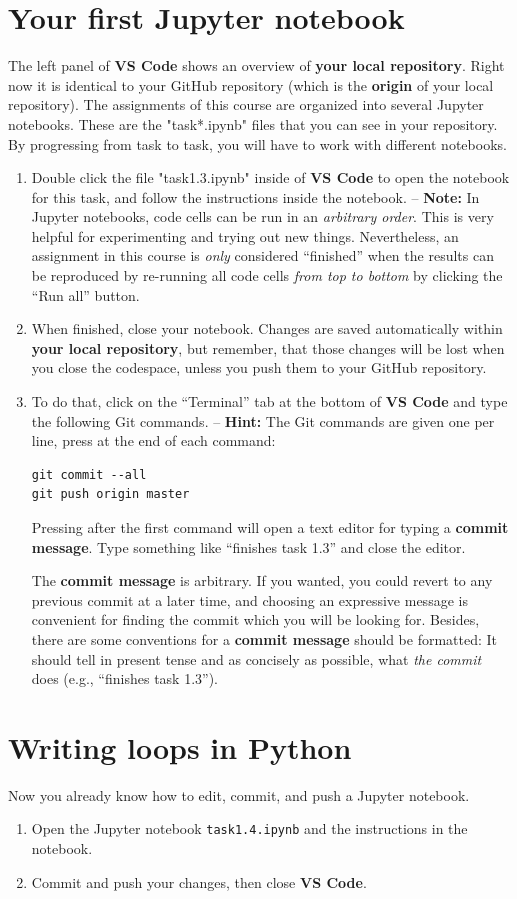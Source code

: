 \documentclass[12pt,a4paper]{article}
\begin{document}
\section{Your first Jupyter notebook}
The left panel of \textbf{VS Code} shows an overview of \textbf{your local repository}. Right now it is identical to your GitHub repository (which is the \textbf{origin} of your local repository). The assignments of this course are organized into several Jupyter notebooks. These are the "task*.ipynb" files that you can see in your repository. By progressing from task to task, you will have to work with different notebooks.

\begin{enumerate}
\item Double click the file "task1.3.ipynb" inside of \textbf{VS Code} to open the notebook for this task, and follow the instructions inside the notebook. -- \textbf{Note:} In Jupyter notebooks, code cells can be run in an \emph{arbitrary order}. This is very helpful for experimenting and trying out new things. Nevertheless, an assignment in this course is \emph{only} considered ``finished'' when the results can be reproduced by re-running all code cells \emph{from top to bottom} by clicking the ``Run all'' button.
\item When finished, close your notebook. Changes are saved automatically within \textbf{your local repository}, but remember, that those changes will be lost when you close the codespace, unless you push them to your GitHub repository.
\item To do that, click on the ``Terminal'' tab at the bottom of \textbf{VS Code} and type the following Git commands. -- \textbf{Hint:} The Git commands are given one per line, press \Return at the end of each command:
\begin{Verbatim}[frame=single]
git commit --all
git push origin master
\end{Verbatim}
Pressing \Return after the first command will open a text editor for typing a \textbf{commit message}. Type something like ``finishes task 1.3'' and close the editor.

The \textbf{commit message} is arbitrary. If you wanted, you could revert to any previous commit at a later time, and choosing an expressive message is convenient for finding the commit which you will be looking for. Besides, there are some conventions for a \textbf{commit message} should be formatted: It should tell in present tense and as concisely as possible, what \emph{the commit} does (e.g., ``finishes task 1.3'').
\end{enumerate}

\section{Writing loops in Python}
Now you already know how to edit, commit, and push a Jupyter notebook.
\begin{enumerate}
    \item Open the Jupyter notebook \texttt{task1.4.ipynb} and the instructions in the notebook.
    \item Commit and push your changes, then close \textbf{VS Code}.
\end{enumerate}
\end{document}
